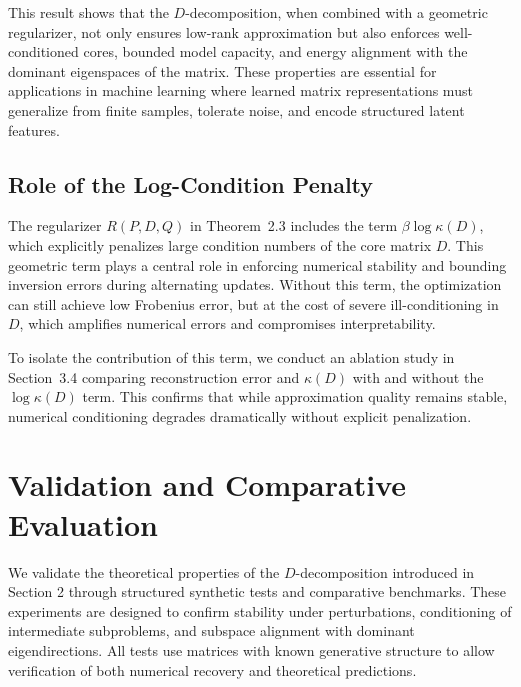 \documentclass[10pt,a4paper]{article}
\begin{document}
This result shows that the $D$-decomposition, when combined with a geometric regularizer, not only ensures low-rank approximation but also enforces well-conditioned cores, bounded model capacity, and energy alignment with the dominant eigenspaces of the matrix. These properties are essential for applications in machine learning where learned matrix representations must generalize from finite samples, tolerate noise, and encode structured latent features.

\subsection{Role of the Log-Condition Penalty}

The regularizer $R(P,D,Q)$ in Theorem~2.3 includes the term $\beta \log \kappa(D)$, which explicitly penalizes large condition numbers of the core matrix $D$. This geometric term plays a central role in enforcing numerical stability and bounding inversion errors during alternating updates. Without this term, the optimization can still achieve low Frobenius error, but at the cost of severe ill-conditioning in $D$, which amplifies numerical errors and compromises interpretability.

To isolate the contribution of this term, we conduct an ablation study in Section~3.4 comparing reconstruction error and $\kappa(D)$ with and without the $\log \kappa(D)$ term. This confirms that while approximation quality remains stable, numerical conditioning degrades dramatically without explicit penalization.



\section{Validation and Comparative Evaluation}

We validate the theoretical properties of the \( D \)-decomposition introduced in Section 2 through structured synthetic tests and comparative benchmarks. These experiments are designed to confirm stability under perturbations, conditioning of intermediate subproblems, and subspace alignment with dominant eigendirections. All tests use matrices with known generative structure to allow verification of both numerical recovery and theoretical predictions.


\end{document}
